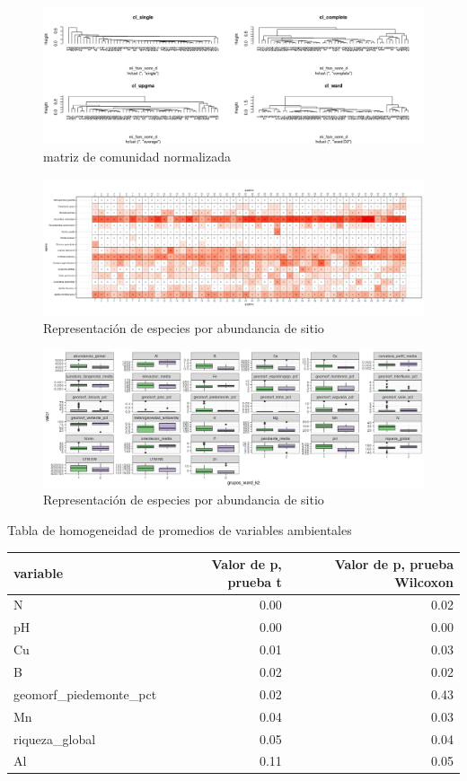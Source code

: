 \documentclass[11pt,]{article}
\begin{document}
\begin{figure}
\centering
\includegraphics[width=1.00000\textwidth]{agrupamiento_metodos.png}
\caption{matriz de comunidad normalizada\label{agrupado}}
\end{figure}

\begin{figure}
\centering
\includegraphics[width=1.10000\textwidth]{abndancia_especie.png}
\caption{Representación de especies por abundancia de
sitio\label{abundancia}}
\end{figure}

\begin{figure}
\centering
\includegraphics[width=1.10000\textwidth]{diagrama_caja_especies.png}
\caption{Representación de especies por abundancia de
sitio\label{homogeneidades}}
\end{figure}

Tabla de homogeneidad de promedios de variables
ambientales\label{promedio}

\begin{longtable}[]{@{}lrr@{}}
\toprule
variable & Valor de p, prueba t & Valor de p, prueba
Wilcoxon\tabularnewline
\midrule
\endhead
N & 0.00 & 0.02\tabularnewline
pH & 0.00 & 0.00\tabularnewline
Cu & 0.01 & 0.03\tabularnewline
B & 0.02 & 0.02\tabularnewline
geomorf\_piedemonte\_pct & 0.02 & 0.43\tabularnewline
Mn & 0.04 & 0.03\tabularnewline
riqueza\_global & 0.05 & 0.04\tabularnewline
Al & 0.11 & 0.05\tabularnewline
\bottomrule
\end{longtable}
\end{document}
